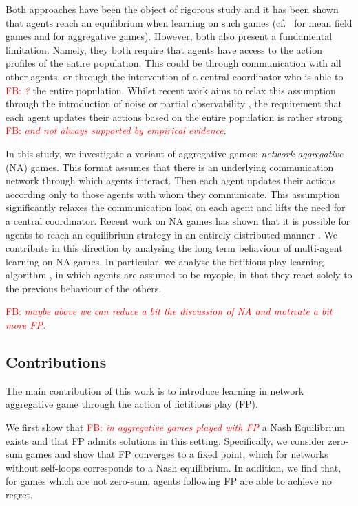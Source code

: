 \documentclass{article}
\theoremstyle{definition}
\newcommand{\fb}[1]{\textcolor{red}{FB: \textit{#1}}}
\begin{document}
Both approaches have been the object of rigorous study and it has been
shown that agents reach an equilibrium when learning on such games
(cf.~\cite{MFGLearningPapers} for mean field games and
\cite{Aggregative Papers} for aggregative games). However, both also
present a fundamental limitation.  Namely, they both require that
agents have access to the action profiles of the entire population.
This could be through communication with all other agents, or through
the intervention of a central coordinator who is able to \fb{?} the
entire population. Whilst recent work aims to relax this assumption
through the introduction of noise \cite{MFG-FP} or partial
observability \cite{AAMASPaper}, the requirement that each agent
updates their actions based on the entire population is rather strong
\fb{and not always supported by empirical evidence}.

In this study, we investigate a variant of aggregative games:
\emph{network aggregative} (NA) games. This format assumes that
there is an underlying communication network through which agents
interact. Then each agent updates their actions according only to
those agents with whom they communicate. This assumption significantly relaxes
the communication load on each agent and lifts the need for a central
coordinator. Recent work on NA games has shown that it is possible
for agents to reach an equilibrium strategy in an entirely distributed
manner \cite{Grammatico, LeaderFollower, MyopicAgents}. We contribute
in this direction by analysing the long term behaviour of multi-agent learning on
 NA games. In particular, we analyse the fictitious play learning
algorithm \cite{Brown, Harris}, in which agents are assumed to be
myopic, in that they react solely to the previous behaviour of the
others.

\fb{maybe above we can reduce a bit the discussion of NA and motivate
  a bit more FP.}


\subsection{Contributions}

  The main contribution of this work is to introduce learning in
  network aggregative game through the action of fictitious play (FP).

  We first show that \fb{in aggregative games played with FP} a Nash Equilibrium exists and that FP admits
  solutions in this setting. Specifically, we consider zero-sum games
  and show that FP converges to a fixed point, which for networks
  without self-loops corresponds to a Nash equilibrium. In
  addition, we find that, for games which are not zero-sum, agents
  following FP are able to achieve no regret.
\end{document}
